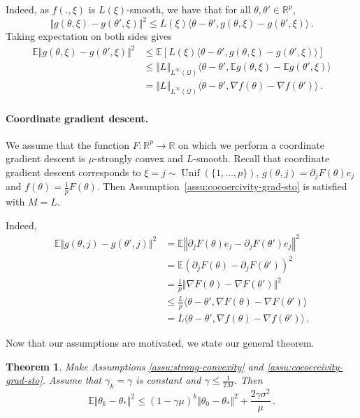 \documentclass[11pt,reqno]{article}
\DeclareMathOperator{\Unif}{Unif}
\newcommand{\E}{\mathbb{E}}
\newcommand{\R}{\mathbb{R}}
\newcommand{\cQ}{\mathcal{Q}}
\renewcommand{\leq}{\leqslant}
\numberwithin{equation}{section}
\theoremstyle{plain}
\newtheorem{thm}[assumption]{Theorem}
\theoremstyle{definition}
\theoremstyle{remark}
\begin{document}
Indeed, as $f(.,\xi)$ is $L(\xi)$-smooth, we have that for all $\theta, \theta' \in \R^p$,
\begin{equation*}
	\Vert g(\theta, \xi) - g(\theta', \xi) \Vert^2 \leq L(\xi) \langle \theta - \theta', g(\theta, \xi) - g(\theta', \xi) \rangle \, .
\end{equation*}
Taking expectation on both sides gives 
\begin{align*}
	\E \Vert g(\theta, \xi) - g(\theta', \xi) \Vert^2 &\leq \E\left[L(\xi) \langle \theta - \theta', g(\theta, \xi) - g(\theta', \xi) \rangle\right] \\
	&\leq \Vert L \Vert_{L^\infty(\cQ)} \langle \theta - \theta', \E g(\theta, \xi) - \E g(\theta', \xi) \rangle \\
	&= \Vert L \Vert_{L^\infty(\cQ)} \langle \theta - \theta', \nabla f(\theta) - \nabla f(\theta') \rangle \, .
\end{align*}

\paragraph{Coordinate gradient descent.} We assume that the function $F:\R^p \to \R$ on which we perform a coordinate gradient descent is $\mu$-strongly convex and $L$-smooth. Recall that coordinate gradient descent corresponds to $\xi = j \sim \Unif(\{1, \dots, p\})$, $g(\theta,j) = \partial_j F(\theta) e_j$ and $f(\theta) = \frac{1}{p} F(\theta)$. Then Assumption~\ref{assu:cocoercivity-grad-sto} is satisfied with $M = L$.

Indeed, 
\begin{align*}
	\E \Vert g(\theta, j) - g(\theta', j) \Vert^2 &= \E \left\Vert \partial_j F(\theta) e_j - \partial_j F(\theta') e_j \right\Vert^2 \\
	&= \E (\partial_j F(\theta) - \partial_j F(\theta'))^2 \\
	&= \frac{1}{p} \Vert \nabla F(\theta) - \nabla F(\theta') \Vert^2 \\
	&\leq \frac{L}{p} \langle \theta - \theta', \nabla F(\theta) - \nabla F(\theta') \rangle \\
	&= L \langle \theta - \theta', \nabla f(\theta) - \nabla f(\theta') \rangle \, .
\end{align*}

Now that our assumptions are motivated, we state our general theorem.

\begin{thm}
	\label{thm:sgd}
	Make Assumptions \ref{assu:strong-convexity} and \ref{assu:cocoercivity-grad-sto}. Assume that $\gamma_k = \gamma$ is constant and $\gamma \leq \frac{1}{2M}$. Then 
	\begin{equation}
		\label{eq:sgd-bound}
		\E \Vert \theta_k - \theta_* \Vert^2 \leq \left(1 - \gamma \mu\right)^k \Vert \theta_0 - \theta_* \Vert^2 + \frac{2\gamma \sigma^2}{\mu} \, .
	\end{equation}
\end{thm}
\end{document}
